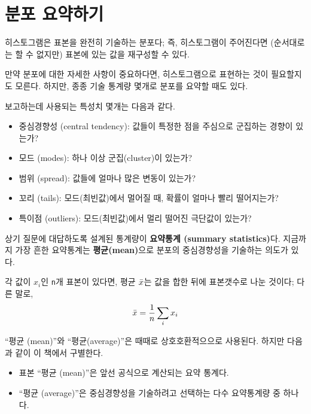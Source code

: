 \section{분포 요약하기}
\label{mean}

히스토그램은 표본을 완전히 기술하는 분포다; 즉, 히스토그램이 주어진다면 (순서대로는 할 수 없지만) 표본에 있는 값을 재구성할 수 있다.

만약 분포에 대한 자세한 사항이 중요하다면, 히스토그램으로 표현하는 것이 필요할지도 모른다.
하지만, 종종 기술 통계량 몇개로 분포를 요약할 때도 있다.

보고하는데 사용되는 특성치 몇개는 다음과 같다.

\begin{itemize}

\item 중심경향성 (central tendency): 
값들이 특정한 점을 주심으로 군집하는 경향이 있는가?

\item 모드 (modes): 하나 이상 군집(cluster)이 있는가?

\item 범위 (spread): 값들에 얼마나 많은 변동이 있는가?

\item 꼬리 (tails): 모드(최빈값)에서 멀어질 때, 확률이 얼마나 빨리 떨어지는가?

\item 특이점 (outliers): 모드(최빈값)에서 멀리 떨어진 극단값이 있는가?

\end{itemize}

상기 질문에 대답하도록 설계된 통계량이 {\bf 요약통계 (summary statistics)}다.
지금까지 가장 흔한 요약통계는  {\bf 평균(mean)}으로 분포의 중심경향성을 기술하는 의도가 있다.

각 값이 $x_i$인 {\tt n}개 표본이 있다면, 평균 $\bar{x}$는 값을 합한 뒤에 표본갯수로 나눈 것이다;
다른 말로, 
%
\[ \bar{x} = \frac{1}{n} \sum_i x_i \]
%

``평균 (mean)''와 ``평균(average)''은 때때로 상호호환적으으로 사용된다. 하지만 다음과 같이 이 책에서 구별한다.


\begin{itemize}

\item 표본 ``평균 (mean)''은 앞선 공식으로 계산되는 요약 통계다.

\item ``평균 (average)''은 중심경향성을 기술하려고 선택하는 다수 요약통계량 중 하나다.

\end{itemize}

